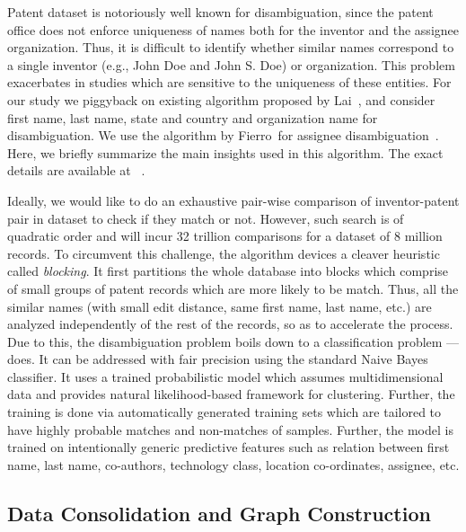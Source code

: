 
Patent dataset is notoriously well known for disambiguation, since the patent office does not enforce uniqueness of names both for the inventor and the assignee organization. Thus, it is difficult to identify whether similar names correspond to a single inventor (e.g., John Doe and John S. Doe) or organization. This problem exacerbates in studies which are sensitive to the uniqueness of these entities.
For our study we piggyback on existing algorithm proposed by Lai~\etal, and consider first name, last name, state and country and organization name for disambiguation.
We use the algorithm by Fierro~\etal for assignee disambiguation~\cite{newdisambiguation}.
Here, we briefly summarize the main insights used in this algorithm. The exact details are available at ~\cite{disambiguation}. 

Ideally, we would like to do an exhaustive pair-wise comparison of inventor-patent pair in dataset to check if they match or not. However, such search is of quadratic order and will incur 32 trillion comparisons for a dataset of 8 million records. 
To circumvent this challenge, the algorithm devices a cleaver heuristic called {\em blocking}. 
It first partitions the whole database into blocks which comprise of small groups of patent records which are more likely to be match. Thus, all the similar names (with small edit distance, same first name, last name, etc.) are 
analyzed independently of the rest of the records, so as to accelerate the process. Due to this, the disambiguation problem boils down to a classification problem --- does. It can be addressed with fair precision using the standard Naive Bayes classifier. 
It uses a trained probabilistic model which assumes multidimensional data and provides natural likelihood-based framework for clustering. Further, the training is done via automatically generated training sets which are tailored to have highly probable matches and non-matches of samples. Further, the model is trained on intentionally generic predictive features such as relation between first name, last name, co-authors, technology class, location co-ordinates, assignee, etc. 

\subsection{Data Consolidation and Graph Construction}

